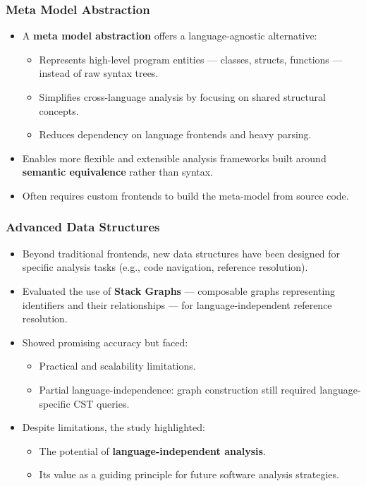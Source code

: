 \documentclass[dvipsnames, 10pt]{beamer}
\begin{document}
\begin{frame}
  \frametitle{Meta Model Abstraction}
  \begin{itemize}
    \item A \textbf{meta model abstraction} offers a language-agnostic alternative:
    \begin{itemize}
        \item Represents high-level program entities — classes, structs, functions — instead of raw syntax trees.
        \item Simplifies cross-language analysis by focusing on shared structural concepts.
        \item Reduces dependency on language frontends and heavy parsing.
    \end{itemize}
    \item Enables more flexible and extensible analysis frameworks built around \textbf{semantic equivalence} rather than syntax.
    \item Often requires custom frontends to build the meta-model from source code.
  \end{itemize}
\end{frame}

\begin{frame}
  \frametitle{Advanced Data Structures}
  \begin{itemize}
      \item Beyond traditional frontends, new data structures have been designed for specific analysis tasks 
      (e.g., code navigation, reference resolution).
      \item Evaluated the use of \textbf{Stack Graphs} — composable graphs representing identifiers 
      and their relationships — for language-independent reference resolution.
      \item Showed promising accuracy but faced:
      \begin{itemize}
          \item Practical and scalability limitations.
          \item Partial language-independence: graph construction still required language-specific CST queries.
      \end{itemize}
      \item Despite limitations, the study highlighted:
      \begin{itemize}
          \item The potential of \textbf{language-independent analysis}.
          \item Its value as a guiding principle for future software analysis strategies.
      \end{itemize}
  \end{itemize}
\end{frame}
\end{document}
